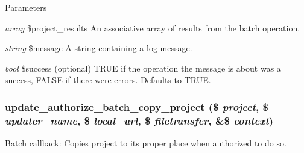\begin{DoxyParams}{Parameters}
\item[{\em array}]\$project\_\-results An associative array of results from the batch operation. \item[{\em string}]\$message A string containing a log message. \item[{\em bool}]\$success (optional) TRUE if the operation the message is about was a success, FALSE if there were errors. Defaults to TRUE. \end{DoxyParams}
\hypertarget{update_8authorize_8inc_ad3fccf701ff21f38940f28a72998d2b2}{
\subsubsection[{update\_\-authorize\_\-batch\_\-copy\_\-project}]{\setlength{\rightskip}{0pt plus 5cm}update\_\-authorize\_\-batch\_\-copy\_\-project (\$ {\em project}, \/  \$ {\em updater\_\-name}, \/  \$ {\em local\_\-url}, \/  \$ {\em filetransfer}, \/  \&\$ {\em context})}}
\label{update_8authorize_8inc_ad3fccf701ff21f38940f28a72998d2b2}
Batch callback: Copies project to its proper place when authorized to do so.


